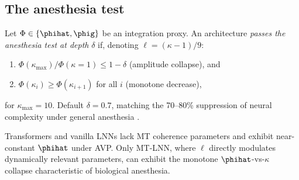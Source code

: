 \subsection{The anesthesia test}
\begin{definition}
Let $\Phi\in\{\phihat,\phig\}$ be an integration proxy. An architecture \emph{passes the anesthesia test at depth} $\delta$ if, denoting $\ell=(\kappa-1)/9$:
\begin{enumerate}[label=(\roman*),noitemsep]
  \item $\Phi(\kappa_\text{max}) / \Phi(\kappa=1) \le 1 - \delta$ \quad (amplitude collapse), and
  \item $\Phi(\kappa_i) \ge \Phi(\kappa_{i+1})$ for all $i$ \quad (monotone decrease),
\end{enumerate}
for $\kappa_\text{max}=10$. Default $\delta=0.7$, matching the 70--80\% suppression of neural complexity under general anesthesia \citep{casali2013theoretically}.
\end{definition}

Transformers and vanilla LNNs lack MT coherence parameters and exhibit near-constant $\phihat$ under AVP. Only MT-LNN, where $\ell$ directly modulates dynamically relevant parameters, can exhibit the monotone $\phihat$-vs-$\kappa$ collapse characteristic of biological anesthesia.

